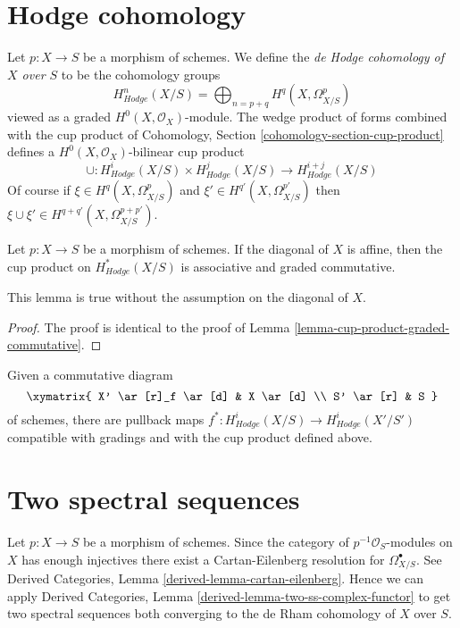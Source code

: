 \section{Hodge cohomology}
\label{section-hodge-cohomology}

\noindent
Let $p : X \to S$ be a morphism of schemes. We define the
{\it de Hodge cohomology of $X$ over $S$} to be the cohomology groups
$$
H^n_{Hodge}(X/S) = \bigoplus\nolimits_{n = p + q} H^q(X, \Omega^p_{X/S})
$$
viewed as a graded $H^0(X, \mathcal{O}_X)$-module. The wedge product
of forms combined with the cup product of
Cohomology, Section \ref{cohomology-section-cup-product}
defines a $H^0(X, \mathcal{O}_X)$-bilinear cup product
$$
\cup :
H^i_{Hodge}(X/S) \times H^j_{Hodge}(X/S)
\longrightarrow
H^{i + j}_{Hodge}(X/S)
$$
Of course if  $\xi \in H^q(X, \Omega^p_{X/S})$ and
$\xi' \in H^{q'}(X, \Omega^{p'}_{X/S})$ then $\xi \cup \xi' \in
H^{q + q'}(X, \Omega^{p + p'}_{X/S})$.

\begin{lemma}
\label{lemma-cup-product-hodge-graded-commutative}
Let $p : X \to S$ be a morphism of schemes. If the diagonal of $X$ is
affine, then the cup product on $H^*_{Hodge}(X/S)$ is associative and
graded commutative.
\end{lemma}

\noindent
This lemma is true without the assumption on the diagonal of $X$.

\begin{proof}
The proof is identical to the proof of
Lemma \ref{lemma-cup-product-graded-commutative}.
\end{proof}

\noindent
Given a commutative diagram
$$
\xymatrix{
X' \ar[r]_f \ar[d] & X \ar[d] \\
S' \ar[r] & S
}
$$
of schemes, there are pullback maps
$f^* : H^i_{Hodge}(X/S) \longrightarrow H^i_{Hodge}(X'/S')$
compatible with gradings and with the cup product defined above.







\section{Two spectral sequences}
\label{section-hdoge-to-de-rham}

\noindent
Let $p : X \to S$ be a morphism of schemes. Since the category
of $p^{-1}\mathcal{O}_S$-modules on $X$ has enough injectives
there exist a Cartan-Eilenberg resolution for $\Omega^\bullet_{X/S}$.
See Derived Categories, Lemma \ref{derived-lemma-cartan-eilenberg}.
Hence we can apply Derived Categories, Lemma
\ref{derived-lemma-two-ss-complex-functor} to get two spectral sequences
both converging to the de Rham cohomology of $X$ over $S$.

